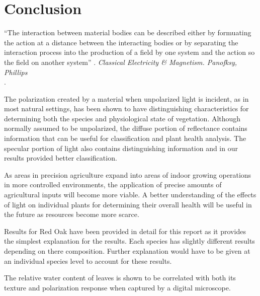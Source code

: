 \chapter{Conclusion}
\begin{center}
  \begin{minipage}{0.75\textwidth}
    \begin{small}
      “The interaction between material bodies can be described either by formuating the action at a distance between the interacting bodies or by separating the interaction process into the production of a field by one system and the action so the field on another system” .
      \emph{Classical Electricity \& Magnetism. Panofksy, Phillips}\\.
    \end{small}
  \end{minipage}
  \vspace{0.5cm}
\end{center}

The polarization created by a material when unpolarized light is incident, as in most natural settings, has been shown to have distinguishing characteristics for determining both the species and physiological state of vegetation.  Although normally assumed to be unpolarized, the diffuse portion of reflectance contains information that can be useful for classification and plant health analysis.  The specular portion of light also contains distinguishing information and in our results provided better classification.

As areas in precision agriculture expand into areas of indoor growing operations in more controlled environments, the application of precise amounts of agricultural inputs will become more viable.  A better understanding of the effects of light on individual plants for determining their overall health will be useful in the future as resources become more scarce.

Results for Red Oak have been provided in detail for this report as it provides the simplest explanation for the results.  Each species has slightly different results depending on there composition.  Further explanation would have to be given at an individual species level to account for these results.

The relative water content of leaves is shown to be correlated with both its texture and polarization response when captured by a digital microscope.

